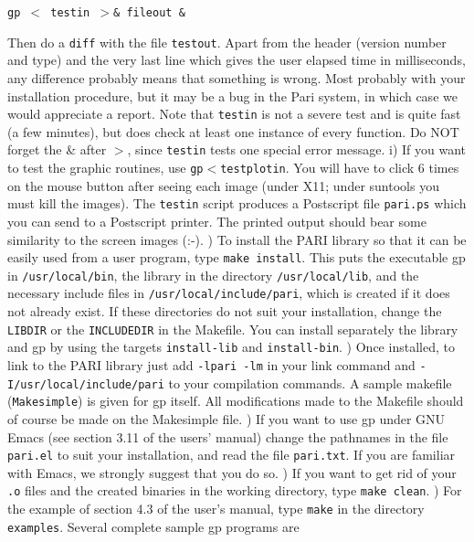 \centerline{\tt gp $<$ testin $>$\& fileout \&}

      Then do a {\tt diff} with the file {\tt testout}. Apart from the header
      (version number and type) and the very last line which gives the user
      elapsed time in milliseconds, any difference probably means that 
      something is wrong. Most probably with your installation procedure, but
      it may be a bug in the Pari system, in which case we would appreciate a
      report. Note that {\tt testin} is not a severe test and is quite fast
      (a few minutes), but does check at least one instance of every function.
      Do NOT forget the \& after $>$, since {\tt testin} tests one special
      error message. 
\medskip
   i) If you want to test the graphic routines, use 
      {\tt gp$<$testplotin}. You will have to click 6 times on the mouse
      button after seeing each image (under X11; under suntools you must kill
      the images). The {\tt testin} script produces a Postscript file 
      {\tt pari.ps} which you can send to a Postscript printer. The printed
      output should bear some similarity to the screen images (:-).
) To install the PARI library so that it can be easily used from a user
   program, type {\tt make install}. This puts the executable gp in 
   {\tt /usr/local/bin}, the library in the directory {\tt /usr/local/lib}, 
   and the necessary include files in {\tt /usr/local/include/pari}, which is
   created if it does not already exist. If these directories do not suit your 
   installation, change the {\tt LIBDIR} or the {\tt INCLUDEDIR} in the
   Makefile. You can install separately the library and gp by using the targets
   {\tt install-lib} and {\tt install-bin}.
) Once installed, to link to the PARI library just add {\tt -lpari -lm} in 
   your link command and {\tt -I/usr/local/include/pari} to your compilation
   commands. A sample makefile ({\tt Makesimple}) is given for gp itself.
   All modifications made to the Makefile should of course be made on the
   Makesimple file.
) If you want to use gp under GNU Emacs (see section 3.11 of the users'
   manual) change the pathnames in the file {\tt pari.el} to suit your 
   installation, and read the file {\tt pari.txt}. If you are familiar with
   Emacs, we strongly suggest that you do so.
) If you want to get rid of your {\tt .o} files and the created binaries in 
   the working directory, type {\tt make clean}.
) For the example of section 4.3 of the user's manual, type {\tt make}
   in the directory {\tt examples}. Several complete sample gp programs are
